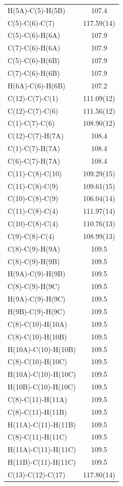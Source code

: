\begin{center}
{\begin{supertabular}{p{1.5in}c}
H(5A)-C(5)-H(5B)&	107.4 \\
C(5)-C(6)-C(7)&	117.59(14) \\
C(5)-C(6)-H(6A)&	107.9 \\
C(7)-C(6)-H(6A)&	107.9 \\
C(5)-C(6)-H(6B)&	107.9 \\
C(7)-C(6)-H(6B)&	107.9 \\
H(6A)-C(6)-H(6B)&	107.2 \\
C(12)-C(7)-C(1)&	111.09(12) \\
C(12)-C(7)-C(6)&	111.56(12) \\
C(1)-C(7)-C(6)&	108.90(12) \\
C(12)-C(7)-H(7A)&	108.4 \\
C(1)-C(7)-H(7A)&	108.4 \\
C(6)-C(7)-H(7A)&	108.4 \\
C(11)-C(8)-C(10)&	109.29(15) \\
C(11)-C(8)-C(9)&	109.61(15) \\
C(10)-C(8)-C(9)&	106.04(14) \\
C(11)-C(8)-C(4)&	111.97(14) \\
C(10)-C(8)-C(4)&	110.76(13) \\
C(9)-C(8)-C(4)&	108.99(13) \\
C(8)-C(9)-H(9A)&	109.5 \\
C(8)-C(9)-H(9B)&	109.5 \\
H(9A)-C(9)-H(9B)&	109.5 \\
C(8)-C(9)-H(9C)	&109.5 \\
H(9A)-C(9)-H(9C)&	109.5 \\
H(9B)-C(9)-H(9C)&	109.5 \\
C(8)-C(10)-H(10A)&	109.5 \\
C(8)-C(10)-H(10B)&	109.5 \\
H(10A)-C(10)-H(10B)&	109.5 \\
C(8)-C(10)-H(10C)&	109.5 \\
H(10A)-C(10)-H(10C)&	109.5 \\
H(10B)-C(10)-H(10C)&	109.5 \\
C(8)-C(11)-H(11A)&	109.5 \\
C(8)-C(11)-H(11B)	&109.5 \\
H(11A)-C(11)-H(11B)&	109.5 \\
C(8)-C(11)-H(11C)&	109.5 \\
H(11A)-C(11)-H(11C)&	109.5 \\
H(11B)-C(11)-H(11C)&	109.5 \\ 
C(13)-C(12)-C(17)&	117.80(14)\\ 

\end{supertabular}}
\end{center}
